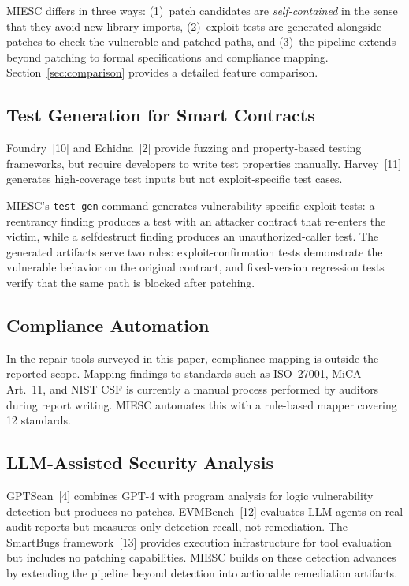 \documentclass[conference]{IEEEtran}
\begin{document}
MIESC differs in three ways: (1)~patch candidates are \emph{self-contained} in the sense that they avoid new library imports, (2)~exploit tests are generated alongside patches to check the vulnerable and patched paths, and (3)~the pipeline extends beyond patching to formal specifications and compliance mapping. Section~\ref{sec:comparison} provides a detailed feature comparison.

\subsection{Test Generation for Smart Contracts}

Foundry~[10] and Echidna~[2] provide fuzzing and property-based testing frameworks, but require developers to write test properties manually. Harvey~[11] generates high-coverage test inputs but not exploit-specific test cases.

MIESC's \texttt{test-gen} command generates vulnerability-specific exploit tests: a reentrancy finding produces a test with an attacker contract that re-enters the victim, while a selfdestruct finding produces an unauthorized-caller test. The generated artifacts serve two roles: exploit-confirmation tests demonstrate the vulnerable behavior on the original contract, and fixed-version regression tests verify that the same path is blocked after patching.

\subsection{Compliance Automation}

In the repair tools surveyed in this paper, compliance mapping is outside the reported scope. Mapping findings to standards such as ISO~27001, MiCA Art.~11, and NIST CSF is currently a manual process performed by auditors during report writing. MIESC automates this with a rule-based mapper covering 12 standards.

\subsection{LLM-Assisted Security Analysis}

GPTScan~[4] combines GPT-4 with program analysis for logic vulnerability detection but produces no patches. EVMBench~[12] evaluates LLM agents on real audit reports but measures only detection recall, not remediation. The SmartBugs framework~[13] provides execution infrastructure for tool evaluation but includes no patching capabilities. MIESC builds on these detection advances by extending the pipeline beyond detection into actionable remediation artifacts.
\end{document}
